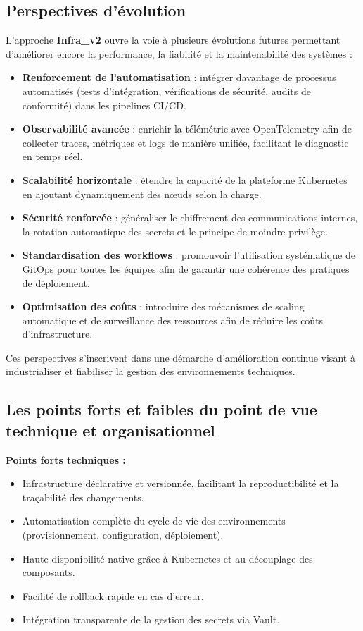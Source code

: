 \subsection{Perspectives d'évolution}

L’approche \textbf{Infra\_v2} ouvre la voie à plusieurs évolutions futures permettant d’améliorer encore la performance, la fiabilité et la maintenabilité des systèmes :

\begin{itemize}
	\item \textbf{Renforcement de l’automatisation} : intégrer davantage de processus automatisés (tests d’intégration, vérifications de sécurité, audits de conformité) dans les pipelines CI/CD.

	\item \textbf{Observabilité avancée} : enrichir la télémétrie avec OpenTelemetry afin de collecter traces, métriques et logs de manière unifiée, facilitant le diagnostic en temps réel.

	\item \textbf{Scalabilité horizontale} : étendre la capacité de la plateforme Kubernetes en ajoutant dynamiquement des nœuds selon la charge.

	\item \textbf{Sécurité renforcée} : généraliser le chiffrement des communications internes, la rotation automatique des secrets et le principe de moindre privilège.

	\item \textbf{Standardisation des workflows} : promouvoir l’utilisation systématique de GitOps pour toutes les équipes afin de garantir une cohérence des pratiques de déploiement.

	\item \textbf{Optimisation des coûts} : introduire des mécanismes de scaling automatique et de surveillance des ressources afin de réduire les coûts d’infrastructure.
\end{itemize}

Ces perspectives s’inscrivent dans une démarche d’amélioration continue visant à industrialiser et fiabiliser la gestion des environnements techniques.

\subsection{Les points forts et faibles du point de vue technique et organisationnel}

\textbf{Points forts techniques :}
\begin{itemize}
	\item Infrastructure déclarative et versionnée, facilitant la reproductibilité et la traçabilité des changements.
	\item Automatisation complète du cycle de vie des environnements (provisionnement, configuration, déploiement).
	\item Haute disponibilité native grâce à Kubernetes et au découplage des composants.
	\item Facilité de rollback rapide en cas d’erreur.
	\item Intégration transparente de la gestion des secrets via Vault.
\end{itemize}


